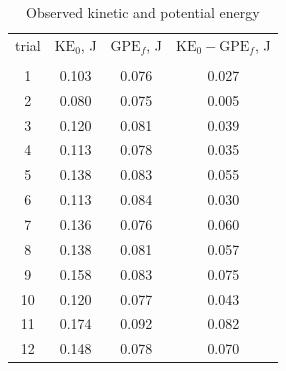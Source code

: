 \begin{table}
  \caption{Observed kinetic and potential energy}
  \label{tab:1}
  \begin{center}
  \begin{ruledtabular}
    \begin{tabular}{SSSS}
      {trial} & {$\text{KE}_0$, \unit{\joule}} & {$\text{GPE}_f$, \unit{\joule}} & {$\text{KE}_0-\text{GPE}_f$, \unit{\joule}} \\
      \colrule \\
      1  & 0.103 & 0.076 & 0.027 \\
      2  & 0.080 & 0.075 & 0.005 \\
      3  & 0.120 & 0.081 & 0.039 \\
      4  & 0.113 & 0.078 & 0.035 \\
      5  & 0.138 & 0.083 & 0.055 \\
      6  & 0.113 & 0.084 & 0.030 \\
      7  & 0.136 & 0.076 & 0.060 \\
      8  & 0.138 & 0.081 & 0.057 \\
      9  & 0.158 & 0.083 & 0.075 \\
      10 & 0.120 & 0.077 & 0.043 \\
      11 & 0.174 & 0.092 & 0.082 \\
      12 & 0.148 & 0.078 & 0.070 \\
    \end{tabular}
  \end{ruledtabular}
\end{center}
\end{table}
